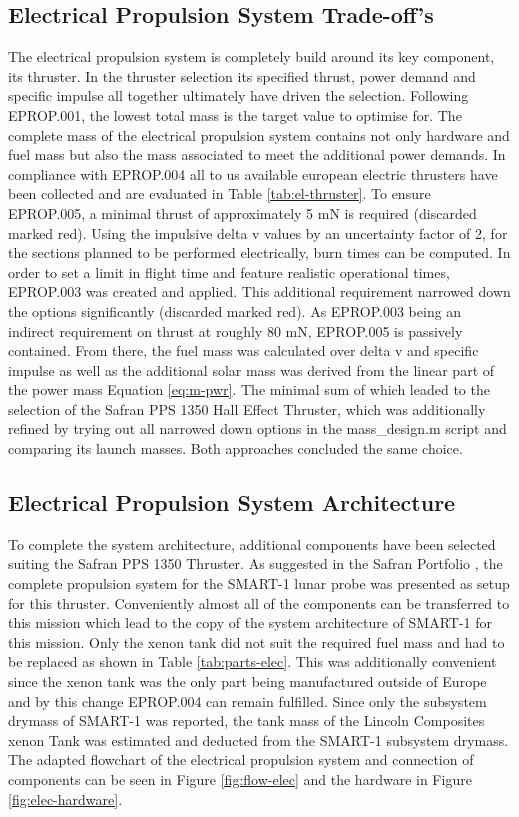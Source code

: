 \documentclass[conference]{IEEEtran}
\begin{document}
\subsection{Electrical Propulsion System Trade-off's}
The electrical propulsion system is completely build around its key component, its thruster.
In the thruster selection its specified thrust, power demand and specific impulse all together ultimately have driven the selection.
Following EPROP.001, the lowest total mass is the target value to optimise for.
The complete mass of the electrical propulsion system contains not only hardware and fuel mass but also the mass associated to meet the additional power demands.
In compliance with EPROP.004 all to us available european electric thrusters have been collected and are evaluated in Table \ref{tab:el-thruster}.
To ensure EPROP.005, a minimal thrust of approximately 5 mN is required (discarded marked red).
Using the impulsive delta v values by an uncertainty factor of 2, for the sections planned to be performed electrically, burn times can be computed.
In order to set a limit in flight time and feature realistic operational times, EPROP.003 was created and applied.
This additional requirement narrowed down the options significantly (discarded marked red).
As EPROP.003 being an indirect requirement on thrust at roughly 80 mN, EPROP.005 is passively contained.
From there, the fuel mass was calculated over delta v and specific impulse as well as the additional solar mass was derived from the linear part of the power mass Equation \ref{eq:m-pwr}. The minimal sum of which leaded to the selection of the Safran PPS 1350 Hall Effect Thruster, which was additionally refined by trying out all narrowed down options in the mass\_design.m script and comparing its launch masses. Both approaches concluded the same choice.

\subsection{Electrical Propulsion System Architecture}
To complete the system architecture, additional components have been selected suiting the Safran PPS 1350 Thruster.
As suggested in the Safran Portfolio \cite{Safran.porfolio}, the complete propulsion system for the SMART-1 lunar probe was presented as setup for this thruster.
Conveniently almost all of the components can be transferred to this mission which lead to the copy of the system architecture of SMART-1 for this mission.
Only the xenon tank did not suit the required fuel mass and had to be replaced as shown in Table \ref{tab:parts-elec}. This was additionally convenient since the xenon tank was the only part being manufactured outside of Europe and by this change EPROP.004 can remain fulfilled.
Since only the subsystem drymass of SMART-1 was reported, the tank mass of the Lincoln Composites xenon Tank was estimated and deducted from the SMART-1 subsystem drymass.
The adapted flowchart of the electrical propulsion system and connection of components can be seen in Figure \ref{fig:flow-elec} and the hardware in Figure \ref{fig:elec-hardware}.
\end{document}
